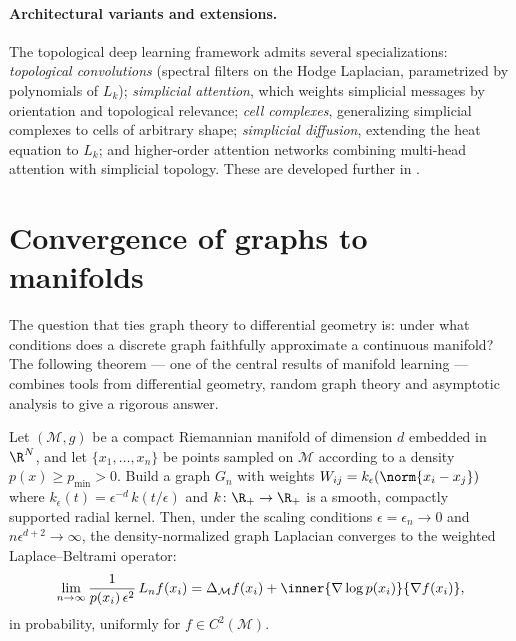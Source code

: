 \paragraph{Architectural variants and extensions.}
The topological deep learning framework admits several specializations:
\emph{topological convolutions} (spectral filters on the Hodge Laplacian,
parametrized by polynomials of $L_k$); \emph{simplicial attention}, which weights
simplicial messages by orientation and topological relevance; \emph{cell
complexes}, generalizing simplicial complexes to cells of arbitrary shape;
\emph{simplicial diffusion}, extending the heat equation to $L_k$; and
higher-order attention networks combining multi-head attention with simplicial
topology. These are developed further in .

\section{Convergence of graphs to manifolds}
\label{sec:graphs:convergence}

The question that ties graph theory to differential geometry is: under what
conditions does a discrete graph faithfully approximate a continuous manifold?
The following theorem --- one of the central results of manifold learning ---
combines tools from differential geometry, random graph theory and asymptotic
analysis to give a rigorous answer.

\begin{theorem}
\label{thm:graphs:convergence}
Let $(\mathcal{M}, g)$ be a compact Riemannian manifold of dimension $d$ embedded
in $\R^N$, and let $\{x_1, \dots, x_n\}$ be points sampled on $\mathcal{M}$
according to a density $p(x) \ge p_{\min} > 0$. Build a graph $G_n$ with weights
$W_{ij} = k_\epsilon(\norm{x_i - x_j})$ where
$k_\epsilon(t) = \epsilon^{-d}\, k(t/\epsilon)$ and $k \colon \R_+ \to \R_+$ is a
smooth, compactly supported radial kernel. Then, under the scaling conditions
$\epsilon = \epsilon_n \to 0$ and $n\epsilon^{d+2} \to \infty$, the
density-normalized graph Laplacian converges to the weighted Laplace--Beltrami
operator:
\[
  \lim_{n \to \infty} \frac{1}{p(x_i)\, \epsilon^2}\, L_n f(x_i)
    = \Delta_{\mathcal{M}} f(x_i)
      + \inner{\nabla \log p(x_i)}{\nabla f(x_i)},
\]
in probability, uniformly for $f \in C^2(\mathcal{M})$.
\end{theorem}

